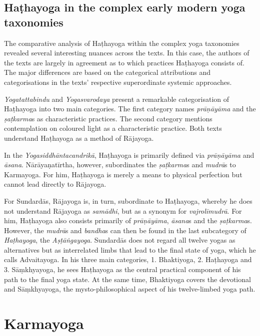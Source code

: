 \subsection{Haṭhayoga in the complex early modern yoga taxonomies}

The comparative analysis of Haṭhayoga within the complex yoga taxonomies revealed several interesting nuances across the texts. In this case, the authors of the texts are largely in agreement as to which practices Haṭhayoga consists of. The major differences are based on the categorical attributions and categorisations in the texts' respective superordinate systemic approaches.

\emph{Yogatattabindu} and \textit{Yogasvarodaya} present a remarkable categorisation of Haṭhayoga into two main categories. The first category names \textit{prāṇāyāma} and the \textit{ṣaṭkarma}s as characteristic practices. The second category mentions contemplation on coloured light as a characteristic practice. Both texts understand Haṭhayoga as a method of Rājayoga.

In the \textit{Yogasiddhāntacandrikā}, Haṭhayoga is primarily defined via \textit{prāṇāyāma} and \textit{āsana}. Nārāyaṇatīrtha, however, subordinates the \textit{ṣaṭkarma}s and \textit{mudrā}s to Karmayoga. For him, Haṭhayoga is merely a means to physical perfection but cannot lead directly to Rājayoga.

For Sundardās, Rājayoga is, in turn, subordinate to Haṭhayoga, whereby he does not understand Rājayoga as \textit{samādhi}, but as a synonym for \textit{vajrolīmudrā}. For him, Haṭhayoga also consists primarily of \textit{prāṇāyāma}, \textit{āsana}s and the \textit{ṣaṭkarma}s. However, the \textit{mudrā}s and \textit{bandha}s can then be found in the last subcategory of \textit{Haṭhayoga}, the \textit{Aṣṭāṅgayoga}. Sundardās does not regard all twelve yogas as alternatives but as interrelated limbs that lead to the final state of yoga, which he calls Advaitayoga. In his three main categories, 1. Bhaktiyoga, 2. Haṭhayoga and 3. Sāṃkhyayoga, he sees Haṭhayoga as the central practical component of his path to the final yoga state. At the same time, Bhaktiyoga covers the devotional and Sāṃkhyayoga, the mysto-philosophical aspect of his twelve-limbed yoga path. 

\section{Karmayoga}
\label{karmayogaintro}

